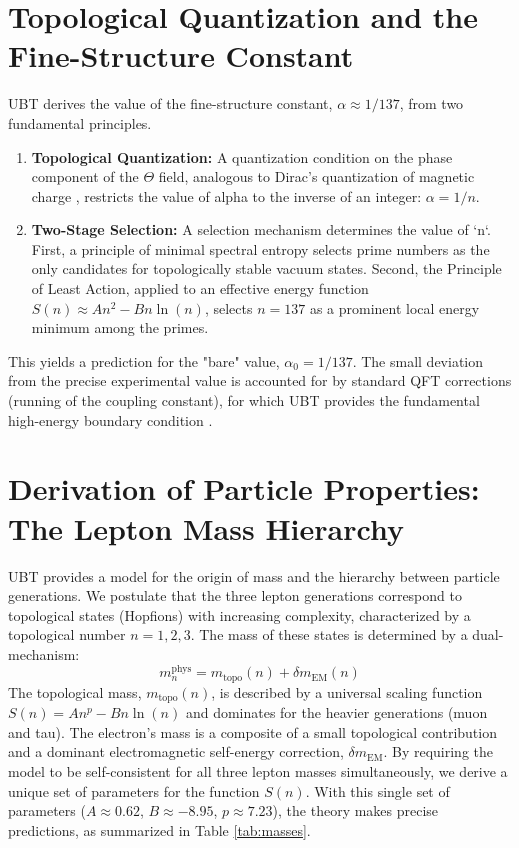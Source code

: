 \documentclass[12pt, a4paper]{article}
\begin{document}
\section{Topological Quantization and the Fine-Structure Constant}
UBT derives the value of the fine-structure constant, \( \alpha \approx 1/137 \), from two fundamental principles.
\begin{enumerate}
    \item \textbf{Topological Quantization:} A quantization condition on the phase component of the \( \Theta \) field, analogous to Dirac's quantization of magnetic charge \cite{PDG2022}, restricts the value of alpha to the inverse of an integer: \( \alpha = 1/n \).
    \item \textbf{Two-Stage Selection:} A selection mechanism determines the value of `n`. First, a principle of minimal spectral entropy selects prime numbers as the only candidates for topologically stable vacuum states. Second, the Principle of Least Action, applied to an effective energy function \( S(n) \approx A n^2 - B n \ln(n) \), selects \( n=137 \) as a prominent local energy minimum among the primes.
\end{enumerate}
This yields a prediction for the "bare" value, \( \alpha_0 = 1/137 \). The small deviation from the precise experimental value is accounted for by standard QFT corrections (running of the coupling constant), for which UBT provides the fundamental high-energy boundary condition \cite{Peskin1995}.

\section{Derivation of Particle Properties: The Lepton Mass Hierarchy}
UBT provides a model for the origin of mass and the hierarchy between particle generations. We postulate that the three lepton generations correspond to topological states (Hopfions) with increasing complexity, characterized by a topological number \(n=1, 2, 3\). The mass of these states is determined by a dual-mechanism:
\begin{equation}
    m_n^{\text{phys}} = m_{\text{topo}}(n) + \delta m_{\text{EM}}(n)
\end{equation}
The topological mass, \( m_{\text{topo}}(n) \), is described by a universal scaling function \( S(n) = A n^p - B n \ln(n) \) and dominates for the heavier generations (muon and tau). The electron's mass is a composite of a small topological contribution and a dominant electromagnetic self-energy correction, \( \delta m_{\text{EM}} \). By requiring the model to be self-consistent for all three lepton masses simultaneously, we derive a unique set of parameters for the function \(S(n)\). With this single set of parameters (\( A \approx 0.62 \), \( B \approx -8.95 \), \( p \approx 7.23 \)), the theory makes precise predictions, as summarized in Table \ref{tab:masses}.
\end{document}
